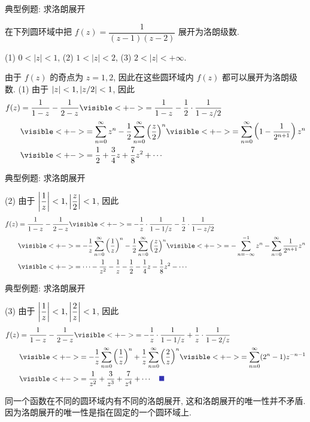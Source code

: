 \begin{frame}{典型例题: 求洛朗展开}
\beqskip{3pt}
\begin{example}
在下列圆环域中把 $f(z)=\dfrac1{(z-1)(z-2)}$ 展开为洛朗级数.

\onslide<+->
(1) $0<|z|<1$, (2) $1<|z|<2$, (3) $2<|z|<+\infty$. 
\end{example}
\begin{solutions}
由于 $f(z)$ 的奇点为 $z=1,2$, 因此在这些圆环域内 $f(z)$ 都可以展开为洛朗级数.
\onslide<+->
(1) 由于 $|z|<1,\left|z/2\right|<1$,
\onslide<+->
因此
\begin{align*}
f(z)&=\frac1{1-z}-\frac1{2-z}
\visible<+->{=\frac1{1-z}-\frac12\cdot\frac1{1-z/2}}\\
&\visible<+->{=\sum_{n=0}^\infty z^n-\frac12\sum_{n=0}^\infty\left(\frac z2\right)^n}
\visible<+->{=\sum_{n=0}^\infty\left(1-\frac1{2^{n+1}}\right)z^n}\\
&\visible<+->{=\frac12+\frac34z+\frac78z^2+\cdots}
\end{align*}
\end{solutions}
\endgroup
\end{frame}


\begin{frame}{典型例题: 求洛朗展开}
\begin{solutionc}
(2) 由于 $\left|\dfrac1z\right|<1,\left|\dfrac z2\right|<1$, 
\onslide<+->
因此
\begin{align*}
f(z)&=\frac1{1-z}-\frac1{2-z}
\visible<+->{=-\frac1z\cdot\frac1{1-1/z}-\frac12\cdot\frac1{1-z/2}}\\
&\visible<+->{=-\frac1z\sum_{n=0}^\infty \left(\frac1z\right)^n-\frac12\sum_{n=0}^\infty\left(\frac z2\right)^n}
\visible<+->{=-\sum_{n=-\infty}^{-1}z^n-\sum_{n=0}^\infty\frac1{2^{n+1}}z^n}\\
&\visible<+->{=\cdots-\frac1{z^2}-\frac1z-\frac12-\frac14z-\frac18z^2-\cdots}
\end{align*}
\end{solutionc}
\end{frame}


\begin{frame}{典型例题: 求洛朗展开}
\begin{solutionc}
(3) 由于 $\left|\dfrac1z\right|<1,\left|\dfrac2z\right|<1$, \onslide<+->
因此
\begin{align*}
f(z)&=\frac1{1-z}-\frac1{2-z}
\visible<+->{=-\frac1z\cdot\frac1{1-1/z}+\frac1z\cdot\frac1{1-2/z}}\\
&\visible<+->{=-\frac1z\sum_{n=0}^\infty \left(\frac1z\right)^n+\frac1z\sum_{n=0}^\infty\left(\frac2z\right)^n}
\visible<+->{=\sum_{n=0}^\infty(2^n-1)z^{-n-1}}\\
&\visible<+->{=\frac1{z^2}+\frac3{z^3}+\frac7{z^4}+\cdots\mqed}
\end{align*}
\end{solutionc}
\onslide<+->
同一个函数在不同的圆环域内有不同的洛朗展开, 这和洛朗展开的唯一性并不矛盾.
\onslide<+->
因为洛朗展开的唯一性是指在固定的一个圆环域上.
\end{frame}


